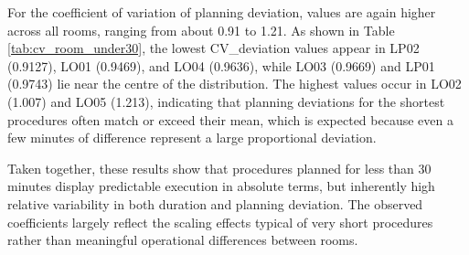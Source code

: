 \documentclass[
]{article}
\begin{document}
For the coefficient of variation of planning deviation, values are again
higher across all rooms, ranging from about 0.91 to 1.21. As shown in
Table \ref{tab:cv_room_under30}, the lowest CV\_deviation values appear
in LP02 (0.9127), LO01 (0.9469), and LO04 (0.9636), while LO03 (0.9669)
and LP01 (0.9743) lie near the centre of the distribution. The highest
values occur in LO02 (1.007) and LO05 (1.213), indicating that planning
deviations for the shortest procedures often match or exceed their mean,
which is expected because even a few minutes of difference represent a
large proportional deviation.

Taken together, these results show that procedures planned for less than
30 minutes display predictable execution in absolute terms, but
inherently high relative variability in both duration and planning
deviation. The observed coefficients largely reflect the scaling effects
typical of very short procedures rather than meaningful operational
differences between rooms.
\end{document}
